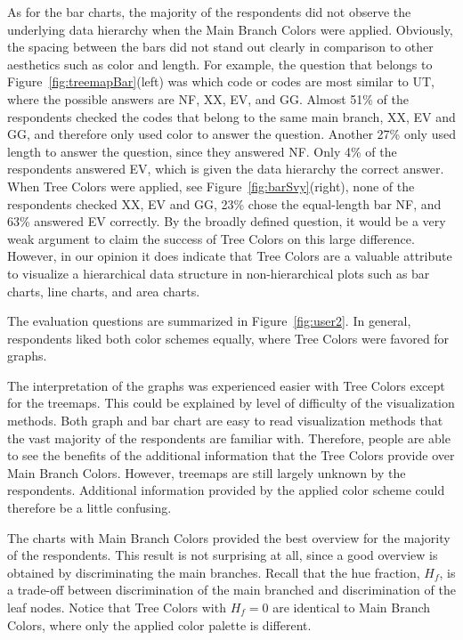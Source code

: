 \documentclass[journal]{vgtc}                %
\begin{document}
As for the bar charts, the majority of the respondents did not observe the underlying data hierarchy when the Main Branch Colors were applied. Obviously, the spacing between the bars did not stand out clearly in comparison to other aesthetics such as color and length. For example, the question that belongs to Figure~\ref{fig:treemapBar}(left) was which code or codes are most similar to UT, where the possible answers are NF, XX, EV, and GG. Almost 51\% of the respondents checked the codes that belong to the same main branch, XX, EV and GG, and therefore only used color to answer the question. Another 27\% only used length to answer the question, since they answered NF. Only 4\% of the respondents answered EV, which is given the data hierarchy the correct answer. When Tree Colors were applied, see Figure~\ref{fig:barSvy}(right), none of the respondents checked XX, EV and GG, 23\% chose the equal-length bar NF, and 63\% answered EV correctly. By the broadly defined question, it would be a very weak argument to claim the success of Tree Colors on this large difference. However, in our opinion it does indicate that Tree Colors are a valuable attribute to visualize a hierarchical data structure in non-hierarchical plots such as bar charts, line charts, and area charts.

The evaluation questions are summarized in Figure~\ref{fig:user2}. In general, respondents liked both color schemes equally, where Tree Colors were favored for graphs.

The interpretation of the graphs was experienced easier with Tree Colors except for the treemaps. This could be explained by level of difficulty of the visualization methods. Both graph and bar chart are easy to read visualization methods that the vast majority of the respondents are familiar with. Therefore, people are able to see the benefits of the additional information that the Tree Colors provide over Main Branch Colors. However, treemaps are still largely unknown by the respondents. Additional information provided by the applied color scheme could therefore be a little confusing.



The charts with Main Branch Colors provided the best overview for the majority of the respondents. This result is not surprising at all, since a good overview is obtained by discriminating the main branches. 
Recall that the hue fraction, $H_f$, is a trade-off between discrimination of the main branched and discrimination of the leaf nodes. Notice that Tree Colors with $H_f=0$ are identical to Main Branch Colors, where only the applied color palette is different.
\end{document}
